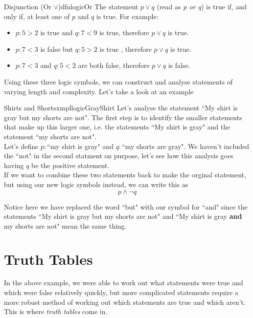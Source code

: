 \begin{dfn}[label={def:logicOr}]{Disjunction (Or $\lor$)}{dfnlogicOr}
    The statement $p \lor q$ (read as \emph{p or q}) is true if, and only if, at least one of $p$ and $q$ is true. For example:
    \begin{itemize}
        \item $p:5 > 2$ is true and $q: 7< 9$ is true, therefore $p \lor q$ is true.
        \item $p: 7< 3$ is false but $q:5 > 2$ is true , therefore $p \lor q$ is true.
        \item $p:7 < 3$ and $q: 5 < 2$ are both false, therefore $p \lor q$ is false.
    \end{itemize}
\end{dfn}

Using these three logic symbols, we can construct and analyse statements of varying length and complexity. Let's take a look at an example

\begin{exmpl}[label={exmpl:logicGrayShirt}]{Shirts and Shorts}{xmpllogicGrayShirt}
    Let's analyse the statement ``My shirt is gray but my shorts are not". The first step is to identify the smaller statements that make up this larger one, i.e. the statements ``My shirt is gray" and the statement ``my shorts are not".\\

    Let's define $p:$``my shirt is gray" and $q:$``my shorts are gray". We haven't included the ``not" in the second statment on purpose, let's see how this analysis goes having $q$ be the positive statement.\\

    If we want to combine these two statements back to make the orginal statement, but using our new logic symbols instead, we can write this as
    $$ p \land \lnot q$$

    Notice here we have replaced the word ``but" with our symbol for ``and" since the statements  ``My shirt is gray but my shorts are not" and ``My shirt is gray \textbf{and} my shorts are not" mean the same thing.
\end{exmpl}

\section{Truth Tables}
In the above example, we were able to work out what statements were true and which were false relatively quickly, but more complicated statements require a more robust method of working out which statements are true and which aren't. This is where \emph{truth tables} come in.\\

